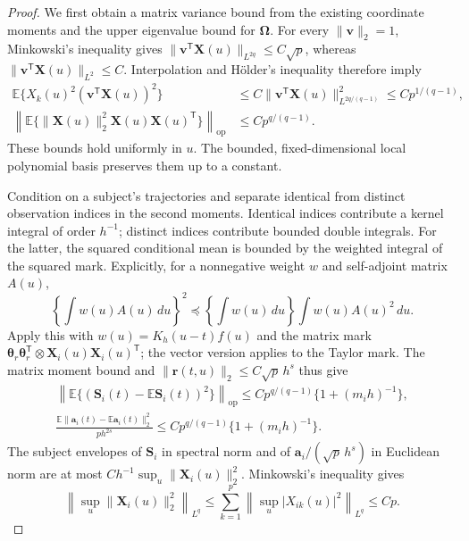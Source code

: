 \documentclass[10pt]{book}
\newcommand{\ba}{{\mathbf a}}
\newcommand{\br}{{\mathbf r}}
\newcommand{\bv}{{\mathbf v}}
\newcommand{\bS}{{\mathbf S}}
\newcommand{\bX}{{\mathbf X}}
\newcommand{\btheta}  {\boldsymbol{\theta}}
\newcommand{\bOmega} {\boldsymbol{\Omega}}
\newcommand{\expect}{\mathbb{E}}
\newcommand{\trans}{{\scriptscriptstyle\mathsf{T}}}
\numberwithin{equation}{section}
\begin{document}
\begin{proof}
We first obtain a matrix variance bound from the existing coordinate
moments and the upper eigenvalue bound for $\bOmega$. For every
$\|\bv\|_2=1$, Minkowski's inequality gives
$\|\bv^\trans\bX(u)\|_{L^{2q}}\le C\sqrt p$, whereas
$\|\bv^\trans\bX(u)\|_{L^2}\le C$. Interpolation and H\"older's
inequality therefore imply
\[
\begin{split}
\expect\{X_k(u)^2(\bv^\trans\bX(u))^2\}
&\le C\|\bv^\trans\bX(u)\|_{L^{2q/(q-1)}}^2
\le Cp^{1/(q-1)},\\
\left\|\expect\{\|\bX(u)\|_2^2\bX(u)\bX(u)^\trans\}
\right\|_{\mathrm{op}}&\le Cp^{q/(q-1)}.
\end{split}
\]
These bounds hold uniformly in $u$. The bounded, fixed-dimensional
local polynomial basis preserves them up to a constant.

Condition on a subject's trajectories and separate identical from
distinct observation indices in the second moments. Identical indices
contribute a kernel integral of order $h^{-1}$; distinct indices
contribute bounded double integrals. For the latter, the squared
conditional mean is bounded by the weighted integral of the squared
mark. Explicitly, for a nonnegative weight $w$ and self-adjoint
matrix $A(u)$,
\[
\left\{\int w(u)A(u)\,du\right\}^2
\preceq\left\{\int w(u)\,du\right\}
\int w(u)A(u)^2\,du.
\]
Apply this with $w(u)=K_h(u-t)f(u)$ and the matrix mark
$\btheta_r\btheta_r^\trans\otimes\bX_i(u)\bX_i(u)^\trans$;
the vector version applies to the Taylor mark.
The matrix moment bound and
$\|\br(t,u)\|_2\le C\sqrt p\,h^s$ thus give
\[
\begin{gathered}
\left\|\expect\{(\bS_i(t)-\expect\bS_i(t))^2\}
\right\|_{\mathrm{op}}
\le Cp^{q/(q-1)}\{1+(m_i h)^{-1}\},\\
\frac{\expect\|\ba_i(t)-\expect\ba_i(t)\|_2^2}{p h^{2s}}
\le Cp^{q/(q-1)}\{1+(m_i h)^{-1}\}.
\end{gathered}
\]
The subject envelopes of $\bS_i$ in spectral norm and of
$\ba_i/(\sqrt p\,h^s)$ in Euclidean norm are at most
$Ch^{-1}\sup_u\|\bX_i(u)\|_2^2$. Minkowski's inequality gives
\[
\left\|\sup_u\|\bX_i(u)\|_2^2\right\|_{L^q}
\le\sum_{k=1}^p\left\|\sup_u|X_{ik}(u)|^2\right\|_{L^q}
\le Cp.
\]


\end{proof}
\end{document}
